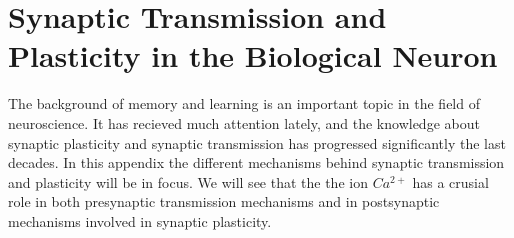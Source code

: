 

% 
%
%








\chapter{Synaptic Transmission and Plasticity in the Biological Neuron} %



\label{appendixSynPlast}

The background of memory and learning is an important topic in the field of neuroscience. 
It has recieved much attention lately, and the knowledge about synaptic plasticity and synaptic transmission has progressed significantly the last decades.
In this appendix the different mechanisms behind synaptic transmission and plasticity will be in focus.
We will see that the the ion $Ca^{2+}$ has a crusial role in both presynaptic transmission mechanisms and in postsynaptic mechanisms involved in synaptic plasticity.



